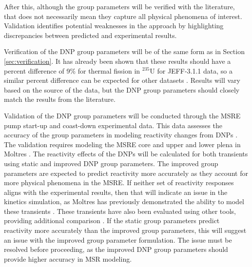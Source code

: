 After this, although the group parameters will be verified with the literature, that does not necessarily mean they capture all physical phenomena of interest.
Validation identifies potential weaknesses in the approach by highlighting discrepancies between predicted and experimental results.

Verification of the \gls{DNP} group parameters will be of the same form as in Section \ref{sec:verification}.
It has already been shown that these results should have a percent difference of 9\% for thermal fission in $^{235}$U for \gls{JEFF}-3.1.1 data, so a similar percent difference can be expected for other datasets \cite{mathieu2012new}.
Results will vary based on the source of the data, but the \gls{DNP} group parameters should closely match the results from the literature.

Validation of the \gls{DNP} group parameters will be conducted through the \gls{MSRE} pump start-up and coast-down experimental data.
This data assesses the accuracy of the group parameters in modeling reactivity changes from \glspl{DNP} \cite{prince1968zero}.
The validation requires modeling the \gls{MSRE} core and upper and lower plena in Moltres \cite{fratoni2020molten}.
The reactivity effects of the \glspl{DNP} will be calculated for both transients using static and improved \gls{DNP} group parameters.
The improved group parameters are expected to predict reactivity more accurately as they account for more physical phenomena in the \gls{MSRE}.
If neither set of reactivity responses aligns with the experimental results, then that will indicate an issue in the kinetics simulation, as Moltres has previously demonstrated the ability to model these transients \cite{reynolds2023analysis, park_advancements_2025}.
These transients have also been evaluated using other tools, providing additional comparison \cite{fei2021msre, delpech2003benchmark}.
If the static group parameters predict reactivity more accurately than the improved group parameters, this will suggest an issue with the improved group parameter formulation.
The issue must be resolved before proceeding, as the improved \gls{DNP} group parameters should provide higher accuracy in \gls{MSR} modeling.

